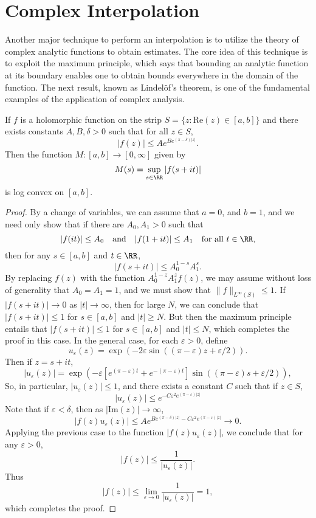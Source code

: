 \section{Complex Interpolation}

Another major technique to perform an interpolation is to utilize the theory of complex analytic functions to obtain estimates. The core idea of this technique is to exploit the maximum principle, which says that bounding an analytic function at its boundary enables one to obtain bounds everywhere in the domain of the function. The next result, known as Lindel\"{o}f's theorem, is one of the fundamental examples of the application of complex analysis.

\begin{theorem}
    If $f$ is a holomorphic function on the strip $S = \{ z : \text{Re}(z) \in [a,b] \}$ and there exists constants $A,B,\delta > 0$ such that for all $z \in S$,
    \[ |f(z)| \leq Ae^{Be^{(\pi - \delta)|z|}}. \]
    Then the function $M: [a,b] \to [0,\infty]$ given by
    \[ M(s) = \sup_{s \in \RR} |f(s + it)| \]
    is log convex on $[a,b]$.
\end{theorem}
\begin{proof}
    By a change of variables, we can assume that $a = 0$, and $b = 1$, and we need only show that if there are $A_0, A_1 > 0$ such that
    \[ |f(it)| \leq A_0 \quad\text{and}\quad |f(1 + it)| \leq A_1 \quad \text{for all $t \in \RR$}, \]
    then for any $s \in [a,b]$ and $t \in \RR$,
    \[ |f(s + it)| \leq A_0^{1 - s} A_1^s. \]
    By replacing $f(z)$ with the function $A_0^{1-z} A_1^z f(z)$, we may assume without loss of generality that $A_0 = A_1 = 1$, and we must show that $\| f \|_{L^\infty(S)} \leq 1$. If $|f(s + it)| \to 0$ as $|t| \to \infty$, then for large $N$, we can conclude that $|f(s + it)| \leq 1$ for $s \in [a,b]$ and $|t| \geq N$. But then the maximum principle entails that $|f(s + it)| \leq 1$ for $s \in [a,b]$ and $|t| \leq N$, which completes the proof in this case. In the general case, for each $\varepsilon > 0$, define
    \[ u_\varepsilon(z) = \exp(- 2 \varepsilon \sin((\pi - \varepsilon) z + \varepsilon/2)). \]
    Then if $z = s + it$,
    \[ |u_\varepsilon(z)| = \exp(- \varepsilon [e^{(\pi - \varepsilon) t} + e^{-(\pi - \varepsilon) t}] \sin((\pi - \varepsilon) s + \varepsilon/2)), \]
    So, in particular, $|u_\varepsilon(z)| \leq 1$, and there exists a constant $C$ such that if $z \in S$,
    \[ |u_\varepsilon(z)| \leq e^{- C \varepsilon^2 e^{(\pi - \varepsilon) |z|}} \]
    Note that if $\varepsilon < \delta$, then as $|\text{Im}(z)| \to \infty$,
    \[ |f(z) u_\varepsilon(z)| \leq A e^{B e^{(\pi - \delta) |z|} - C \varepsilon^2 e^{(\pi - \varepsilon) |z|} } \to 0. \]
    Applying the previous case to the function $|f(z) u_\varepsilon(z)|$, we conclude that for any $\varepsilon > 0$,
    \[ |f(z)| \leq \frac{1}{|u_\varepsilon(z)|}. \]
    Thus
    \[ |f(z)| \leq \lim_{\varepsilon \to 0} \frac{1}{|u_\varepsilon(z)|} = 1, \]
    which completes the proof.
\end{proof}

